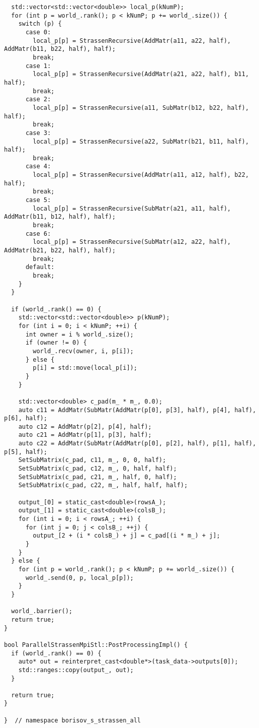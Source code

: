 \documentclass[12pt]{article}
\begin{document}
\begin{lstlisting}
  std::vector<std::vector<double>> local_p(kNumP);
  for (int p = world_.rank(); p < kNumP; p += world_.size()) {
    switch (p) {
      case 0:
        local_p[p] = StrassenRecursive(AddMatr(a11, a22, half), AddMatr(b11, b22, half), half);
        break;
      case 1:
        local_p[p] = StrassenRecursive(AddMatr(a21, a22, half), b11, half);
        break;
      case 2:
        local_p[p] = StrassenRecursive(a11, SubMatr(b12, b22, half), half);
        break;
      case 3:
        local_p[p] = StrassenRecursive(a22, SubMatr(b21, b11, half), half);
        break;
      case 4:
        local_p[p] = StrassenRecursive(AddMatr(a11, a12, half), b22, half);
        break;
      case 5:
        local_p[p] = StrassenRecursive(SubMatr(a21, a11, half), AddMatr(b11, b12, half), half);
        break;
      case 6:
        local_p[p] = StrassenRecursive(SubMatr(a12, a22, half), AddMatr(b21, b22, half), half);
        break;
      default:
        break;
    }
  }

  if (world_.rank() == 0) {
    std::vector<std::vector<double>> p(kNumP);
    for (int i = 0; i < kNumP; ++i) {
      int owner = i % world_.size();
      if (owner != 0) {
        world_.recv(owner, i, p[i]);
      } else {
        p[i] = std::move(local_p[i]);
      }
    }

    std::vector<double> c_pad(m_ * m_, 0.0);
    auto c11 = AddMatr(SubMatr(AddMatr(p[0], p[3], half), p[4], half), p[6], half);
    auto c12 = AddMatr(p[2], p[4], half);
    auto c21 = AddMatr(p[1], p[3], half);
    auto c22 = AddMatr(SubMatr(AddMatr(p[0], p[2], half), p[1], half), p[5], half);
    SetSubMatrix(c_pad, c11, m_, 0, 0, half);
    SetSubMatrix(c_pad, c12, m_, 0, half, half);
    SetSubMatrix(c_pad, c21, m_, half, 0, half);
    SetSubMatrix(c_pad, c22, m_, half, half, half);

    output_[0] = static_cast<double>(rowsA_);
    output_[1] = static_cast<double>(colsB_);
    for (int i = 0; i < rowsA_; ++i) {
      for (int j = 0; j < colsB_; ++j) {
        output_[2 + (i * colsB_) + j] = c_pad[(i * m_) + j];
      }
    }
  } else {
    for (int p = world_.rank(); p < kNumP; p += world_.size()) {
      world_.send(0, p, local_p[p]);
    }
  }

  world_.barrier();
  return true;
}

bool ParallelStrassenMpiStl::PostProcessingImpl() {
  if (world_.rank() == 0) {
    auto* out = reinterpret_cast<double*>(task_data->outputs[0]);
    std::ranges::copy(output_, out);
  }

  return true;
}

}  // namespace borisov_s_strassen_all
\end{lstlisting}
\end{document}
